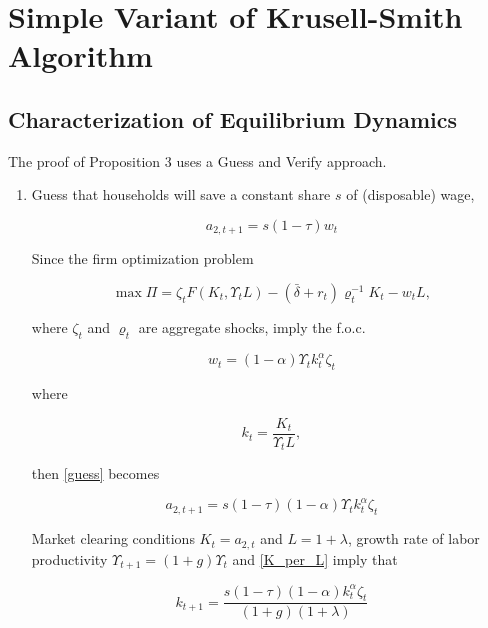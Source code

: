 \documentclass[12pt,a4paper]{article}
\begin{document}
\newpage

\section{Simple Variant of Krusell-Smith Algorithm}

\subsection{Characterization of Equilibrium Dynamics}

The proof of Proposition 3 uses a Guess and Verify approach.

\begin{enumerate}

  \item Guess that households will save a constant share $s$ of (disposable) wage,

    \begin{equation}
      a_{2,t+1} = s(1-\tau)w_t
    \label{guess}
    \end{equation}

  Since the firm optimization problem

    \[
      \max \Pi = \zeta_t F(K_t, \Upsilon_t L) - (\bar{\delta} + r_t)\varrho_t^{-1} K_t - w_t L,
    \]

  where $\zeta_t$ and $\varrho_t$ are aggregate shocks, imply the f.o.c.

    \[
      w_{t} = (1-\alpha)\Upsilon_t k_t^\alpha \zeta_t
    \]

  where

    \begin{equation}
        k_t = \frac{K_t}{\Upsilon_t L},
        \label{K_per_L}
    \end{equation}

  then \ref{guess} becomes

    \begin{equation}
        a_{2,t+1} = s(1-\tau)(1-\alpha)\Upsilon_t k_t^\alpha \zeta_t
    \label{a_guess}
    \end{equation}

  Market clearing conditions $K_t = a_{2,t}$ and $L = 1 + \lambda$, growth rate of labor productivity $\Upsilon_{t+1} = (1+g)\Upsilon_{t}$  and \ref{K_per_L} imply that

    \begin{equation}
        k_{t+1} = \frac{s(1-\tau)(1-\alpha) k_t^\alpha \zeta_t}{(1 + g)(1 + \lambda)}
        \label{K_guess}
    \end{equation}


\end{enumerate}
\end{document}
